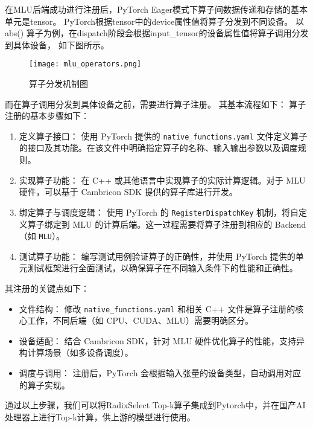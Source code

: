 在MLU后端成功进行注册后，PyTorch Eager模式下算子间数据传递和存储的基本单元是tensor。
PyTorch根据tensor中的device属性值将算子分发到不同设备。
以 abs() 算子为例，在dispatch阶段会根据input\_tensor的设备属性值将算子调用分发到具体设备，
如下图所示。

\begin{figure}
    \centering
    \texttt{[image: mlu\_operators.png]}
    \caption{算子分发机制图}
    \label{fig:mlu_operators}
\end{figure}

而在算子调用分发到具体设备之前，需要进行算子注册。
其基本流程如下：
算子注册的基本步骤如下：
\begin{enumerate}
    \item {定义算子接口}：
    使用 PyTorch 提供的 \texttt{native\_functions.yaml} 文件定义算子的接口及其功能。在该文件中明确指定算子的名称、输入输出参数以及调度规则。
    
    \item {实现算子功能}：
    在 C++ 或其他语言中实现算子的实际计算逻辑。对于 MLU 硬件，可以基于 Cambricon SDK 提供的算子库进行开发。
    
    \item {绑定算子与调度逻辑}：
    使用 PyTorch 的 \texttt{RegisterDispatchKey} 机制，将自定义算子绑定到 MLU 的计算后端。这一过程需要将算子注册到相应的 Backend（如 \texttt{MLU}）。
    
    \item {测试算子功能}：
    编写测试用例验证算子的正确性，并使用 PyTorch 提供的单元测试框架进行全面测试，以确保算子在不同输入条件下的性能和正确性。
\end{enumerate}
其注册的关键点如下：
\begin{itemize}
    \item {文件结构}：
    修改 \texttt{native\_functions.yaml} 和相关 C++ 文件是算子注册的核心工作，不同后端（如 CPU、CUDA、MLU）需要明确区分。
    
    \item {设备适配}：
    结合 {Cambricon SDK}，针对 MLU 硬件优化算子的性能，支持异构计算场景（如多设备调度）。
    
    \item {调度与调用}：
    注册后，PyTorch 会根据输入张量的设备类型，自动调用对应的算子实现。
\end{itemize}

通过以上步骤，我们可以将RadixSelect Top-k算子集成到Pytorch中，并在国产AI处理器上进行Top-k计算，供上游的模型进行使用。



